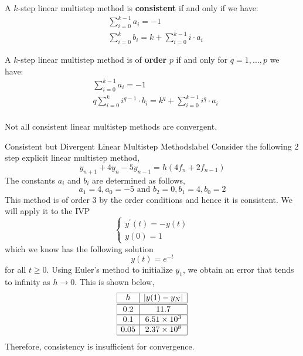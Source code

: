\begin{thm}
	A $k$-step linear multistep method is \textbf{consistent} if and only if we have:
	\begin{align*}
	&\sum_{i=0}^{k-1} a_i=-1 \\
	&\sum_{i=0}^k b_i=k+\sum_{i=0}^{k-1} i \cdot a_i
	\end{align*}
\end{thm}

\begin{thm}
	A $k$-step linear multistep method is of \textbf{order} $p$ if and only for $q = 1, \ldots, p$ we have:
	\begin{align*}
		&\sum_{i=0}^{k-1} a_i=-1 \\
		&q \sum_{i=0}^k i^{q-1} \cdot b_i=k^q+\sum_{i=0}^{k-1} i^q \cdot a_i \\
	\end{align*}
	
\end{thm}

\begin{marginfigure}
	Not all consistent linear multistep methods are convergent.
\end{marginfigure}

\begin{ex}{Consistent but Divergent Linear Multistep Methods}{label}
	Consider the following $2$ step explicit linear multistep method,
	\[y_{n+1}+4 y_n-5 y_{n-1}=h\left(4 f_n+2 f_{n-1}\right)\]
	The constants $a_i$ and $b_i$ are determined as follows,
	\[a_1=4, a_0=-5 \text { and } b_2=0, b_1=4, b_0=2\]
	This method is of order $3$ by the order conditions and hence it is consistent. We will apply it to the IVP
	\[\left\{\begin{array}{l}
	y^{\prime}(t)=-y(t) \\
	y(0)=1
	\end{array}\right.\]
	which we know has the following solution
	\[y(t) = e^{-t}\]
	for all $t \geq 0$. Using Euler's method to initialize $y_1$, we obtain an error that tends to infinity as $h \rightarrow 0$. This is shown below,
	\[\begin{array}{|c|c|}
	\hline h & \left|y(1)-y_N\right| \\
	\hline \hline 0.2 & 11.7 \\
	\hline 0.1 & 6.51 \times 10^3 \\
	\hline 0.05 & 2.37 \times 10^8 \\
	\hline
	\end{array}\]
	Therefore, consistency is insufficient for convergence.
\end{ex}

